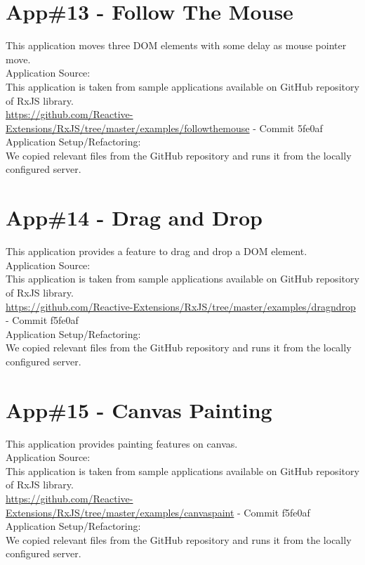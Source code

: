 \section{App\#13 - Follow The Mouse }
This application moves three DOM elements with some delay as mouse pointer move.\\
Application Source: \\
This application is taken from sample applications available on GitHub repository of RxJS library.\\
\url{https://github.com/Reactive-Extensions/RxJS/tree/master/examples/followthemouse} - Commit 5fe0af\\
Application Setup/Refactoring: \\
We copied relevant files from the GitHub repository and runs it from the locally configured server.

\section{App\#14 - Drag and Drop}
This application provides a feature to drag and drop a DOM element.\\
Application Source: \\
This application is taken from sample applications available on GitHub repository of RxJS library.\\
\url{https://github.com/Reactive-Extensions/RxJS/tree/master/examples/dragndrop} - Commit f5fe0af\\
Application Setup/Refactoring: \\
We copied relevant files from the GitHub repository and runs it from the locally configured server.


\section{App\#15 - Canvas Painting }
This application provides painting features on canvas.\\
Application Source: \\
This application is taken from sample applications available on GitHub repository of RxJS library.\\
\url{https://github.com/Reactive-Extensions/RxJS/tree/master/examples/canvaspaint} - Commit f5fe0af\\
Application Setup/Refactoring: \\
We copied relevant files from the GitHub repository and runs it from the locally configured server.





